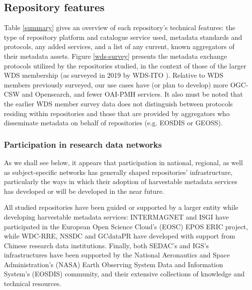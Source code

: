 \documentclass{interact}
\begin{document}
\subsection{Repository features}\label{features}
Table \ref{summary} gives an overview of each repository's technical features: the type of repository platform and catalogue service used, metadata standards and protocols, any added services, and a list of any current, known aggregators of their metadata assets. Figure \ref{wds-survey} presents the metadata exchange protocols utilized by the repositories studied, in the context of those of the larger WDS membership (as surveyed in 2019 by WDS-ITO \parencite{payne_world_2020}). Relative to WDS members previously surveyed, our use cases have (or plan to develop) more OGC-CSW and Opensearch, and fewer OAI-PMH services. It also must be noted that the earlier WDS member survey data does not distinguish between protocols residing within repositories and those that are provided by aggregators who disseminate metadata on behalf of repositories (e.g. EOSDIS or GEOSS).

\subsubsection{Participation in research data networks}
As we shall see below, it appears that participation in national, regional, as well as subject-specific networks has generally shaped repositories' infrastructure, particularly the ways in which their adoption of harvestable metadata services has developed or will be developed in the near future.

All studied repositories have been guided or supported by a larger entity while developing harvestable metadata services: INTERMAGNET and ISGI have participated in the European Open Science Cloud's (EOSC) EPOS ERIC project, while WDC-RRE, NSSDC and GCdataPR have developed with support from Chinese research data institutions. Finally, both SEDAC's and IGS's infrastructures have been supported by the National Aeronautics and Space Administration’s (NASA) Earth Observing System Data and Information System's (EOSDIS) community, and their extensive collections of knowledge and technical resources.
\end{document}
